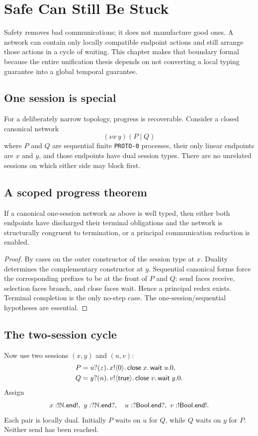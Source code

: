 \chapter{Safe Can Still Be Stuck}

Safety removes bad communications; it does not manufacture good ones. A network can contain only locally compatible endpoint actions and still arrange those actions in a cycle of waiting. This chapter makes that boundary formal because the entire unification thesis depends on not converting a local typing guarantee into a global temporal guarantee.

\section{One session is special}
For a deliberately narrow topology, progress is recoverable. Consider a closed canonical network
\[
(\nu x\,y)(P\mid Q)
\]
where $P$ and $Q$ are sequential finite \texttt{PROTO-0} processes, their only linear endpoints are $x$ and $y$, and those endpoints have dual session types. There are no unrelated sessions on which either side may block first.



\section{A scoped progress theorem}
\begin{theorem}
If a canonical one-session network as above is well typed, then either both endpoints have discharged their terminal obligations and the network is structurally congruent to termination, or a principal communication reduction is enabled.
\end{theorem}
\begin{proof}
By cases on the outer constructor of the session type at $x$. Duality determines the complementary constructor at $y$. Sequential canonical forms force the corresponding prefixes to be at the front of $P$ and $Q$: send faces receive, selection faces branch, and close faces wait. Hence a principal redex exists. Terminal completion is the only no-step case. The one-session/sequential hypotheses are essential.
\end{proof}

\section{The two-session cycle}
Now use two sessions $(x,y)$ and $(u,v)$:
\[
\begin{aligned}
P &= u?(z).\,x!\langle 0\rangle.\,\mathsf{close}\;x.\,\mathsf{wait}\;u.0,\\
Q &= y?(n).\,v!\langle \mathsf{true}\rangle.\,\mathsf{close}\;v.\,\mathsf{wait}\;y.0.
\end{aligned}
\]
Assign
\[
x:!\mathbb{N}.\mathsf{end!},\ y:?\mathbb{N}.\mathsf{end?},
\quad
u:?\mathsf{Bool}.\mathsf{end?},\ v:!\mathsf{Bool}.\mathsf{end!}.
\]
Each pair is locally dual. Initially $P$ waits on $u$ for $Q$, while $Q$ waits on $y$ for $P$. Neither send has been reached.

